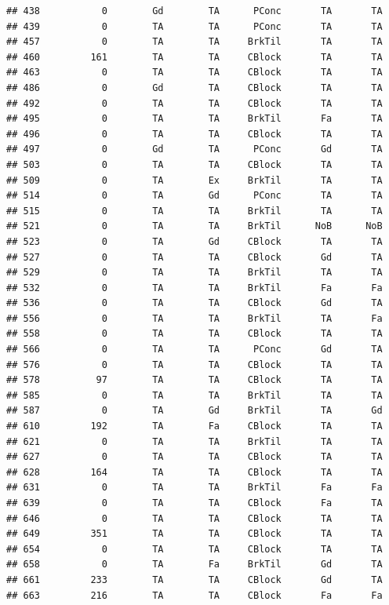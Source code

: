 \documentclass[]{article}
\begin{document}
\begin{verbatim}
## 438           0        Gd        TA      PConc       TA       TA
## 439           0        TA        TA      PConc       TA       TA
## 457           0        TA        TA     BrkTil       TA       TA
## 460         161        TA        TA     CBlock       TA       TA
## 463           0        TA        TA     CBlock       TA       TA
## 486           0        Gd        TA     CBlock       TA       TA
## 492           0        TA        TA     CBlock       TA       TA
## 495           0        TA        TA     BrkTil       Fa       TA
## 496           0        TA        TA     CBlock       TA       TA
## 497           0        Gd        TA      PConc       Gd       TA
## 503           0        TA        TA     CBlock       TA       TA
## 509           0        TA        Ex     BrkTil       TA       TA
## 514           0        TA        Gd      PConc       TA       TA
## 515           0        TA        TA     BrkTil       TA       TA
## 521           0        TA        TA     BrkTil      NoB      NoB
## 523           0        TA        Gd     CBlock       TA       TA
## 527           0        TA        TA     CBlock       Gd       TA
## 529           0        TA        TA     BrkTil       TA       TA
## 532           0        TA        TA     BrkTil       Fa       Fa
## 536           0        TA        TA     CBlock       Gd       TA
## 556           0        TA        TA     BrkTil       TA       Fa
## 558           0        TA        TA     CBlock       TA       TA
## 566           0        TA        TA      PConc       Gd       TA
## 576           0        TA        TA     CBlock       TA       TA
## 578          97        TA        TA     CBlock       TA       TA
## 585           0        TA        TA     BrkTil       TA       TA
## 587           0        TA        Gd     BrkTil       TA       Gd
## 610         192        TA        Fa     CBlock       TA       TA
## 621           0        TA        TA     BrkTil       TA       TA
## 627           0        TA        TA     CBlock       TA       TA
## 628         164        TA        TA     CBlock       TA       TA
## 631           0        TA        TA     BrkTil       Fa       Fa
## 639           0        TA        TA     CBlock       Fa       TA
## 646           0        TA        TA     CBlock       TA       TA
## 649         351        TA        TA     CBlock       TA       TA
## 654           0        TA        TA     CBlock       TA       TA
## 658           0        TA        Fa     BrkTil       Gd       TA
## 661         233        TA        TA     CBlock       Gd       TA
## 663         216        TA        TA     CBlock       Fa       Fa

\end{verbatim}
\end{document}
